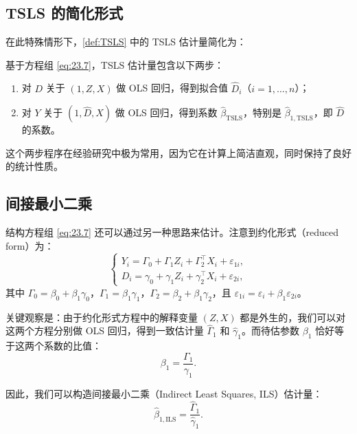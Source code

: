 \subsection{TSLS 的简化形式}\label{sec:TSLS-simplified}

在此特殊情形下，\cref{def:TSLS} 中的 TSLS 估计量简化为：

\begin{Definition}\label{def:TSLS-single}
基于方程组 \cref{eq:23.7}，TSLS 估计量包含以下两步：
\begin{enumerate}
\item[\textbf{第一阶段}] 对 $D$ 关于 $(1, Z, X)$ 做 OLS 回归，得到拟合值 $\hat{D}_i$（$i=1,\ldots,n$）；
\item[\textbf{第二阶段}] 对 $Y$ 关于 $(1, \hat{D}, X)$ 做 OLS 回归，得到系数 $\hat{\beta}_{\mathrm{TSLS}}$，特别是 $\hat{\beta}_{1,\mathrm{TSLS}}$，即 $\hat{D}$ 的系数。
\end{enumerate}
\end{Definition}

这个两步程序在经验研究中极为常用，因为它在计算上简洁直观，同时保持了良好的统计性质。

\subsection{间接最小二乘}\label{sec:ILS}

结构方程组 \cref{eq:23.7} 还可以通过另一种思路来估计。注意到约化形式（reduced form）为：
\begin{equation}
\begin{cases}
Y_i = \Gamma_0 + \Gamma_1 Z_i + \Gamma_2^{\top}X_i + \varepsilon_{1i}, \\
D_i = \gamma_0 + \gamma_1 Z_i + \gamma_2^{\top}X_i + \varepsilon_{2i},
\end{cases} \label{eq:23.8}
\end{equation}
其中 $\Gamma_0 = \beta_0 + \beta_1\gamma_0$，$\Gamma_1 = \beta_1\gamma_1$，$\Gamma_2 = \beta_2 + \beta_1\gamma_2$，且 $\varepsilon_{1i} = \varepsilon_i + \beta_1\varepsilon_{2i}$。

关键观察是：由于约化形式方程中的解释变量 $(Z, X)$ 都是外生的，我们可以对这两个方程分别做 OLS 回归，得到一致估计量 $\hat{\Gamma}_1$ 和 $\hat{\gamma}_1$。而待估参数 $\beta_1$ 恰好等于这两个系数的比值：
\begin{equation}
\beta_1 = \frac{\Gamma_1}{\gamma_1}. \label{eq:23.9}
\end{equation}

因此，我们可以构造间接最小二乘（Indirect Least Squares, ILS）估计量：
\begin{equation}
\hat{\beta}_{1,\mathrm{ILS}} = \frac{\hat{\Gamma}_1}{\hat{\gamma}_1}. \label{eq:23.10}
\end{equation}

